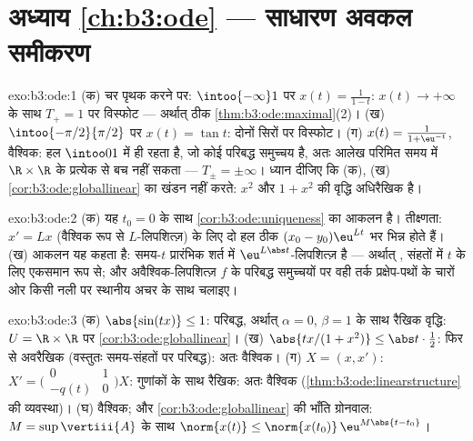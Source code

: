 \section*{अध्याय \ref{ch:b3:ode} --- साधारण अवकल
समीकरण}

\begin{solution}{exo:b3:ode:1}
(क) चर पृथक करने पर: $\intoo{-\infty}1$ पर $x(t) = \frac1{1 - t}$: $x(t) \to
+\infty$ के साथ $T_+ = 1$ पर विस्फोट ---
अर्थात् ठीक \cref{thm:b3:ode:maximal}(2)।
(ख) $\intoo{-\pi/2}{\pi/2}$ पर $x(t) = \tan t$: दोनों सिरों पर विस्फोट।
(ग) $x(t) = \frac{1}{1 + \eu^{-t}}$, वैश्विक: हल $\intoo01$ में ही रहता है, जो कोई परिबद्ध समुच्चय
है, अतः आलेख परिमित समय में $\R\times\R$ के प्रत्येक  से बच नहीं सकता
--- $T_\pm
= \pm\infty$। ध्यान दीजिए कि (क), (ख) \cref{cor:b3:ode:globallinear} का खंडन नहीं करते: $x^2$ और
$1 + x^2$ की वृद्धि अधिरैखिक है।
\end{solution}

\begin{solution}{exo:b3:ode:2}
(क) यह $t_0
= 0$ के साथ \cref{cor:b3:ode:uniqueness} का आकलन है। तीक्ष्णता: $x' = Lx$ (वैश्विक रूप से
$L$-लिपशित्ज़) के लिए दो हल ठीक $(x_0 - y_0)\eu^{Lt}$ भर भिन्न होते हैं।
(ख) आकलन यह कहता है: समय-$t$  प्रारंभिक शर्त में
$\eu^{L\abs t}$-लिपशित्ज़ है --- अर्थात् , संहतों में $t$ के लिए एकसमान
रूप से; और अवैश्विक-लिपशित्ज़ $f$ के परिबद्ध समुच्चयों पर वही तर्क
प्रक्षेप-पथों के चारों ओर किसी  नली पर स्थानीय अचर के साथ चलाइए।
\end{solution}

\begin{solution}{exo:b3:ode:3}
(क) $\abs{\sin(tx)} \leq 1$: परिबद्ध, अर्थात् $\alpha = 0$, $\beta = 1$ के साथ रैखिक वृद्धि: $U = \R\times\R$ पर
\cref{cor:b3:ode:globallinear}।
(ख) $\abs{tx/(1 + x^2)} \leq \abs t\cdot\frac12$: फिर से अवरैखिक (वस्तुतः समय-संहतों पर परिबद्ध): अतः
वैश्विक।
(ग) $X = (x, x')$: $X' = \bigl(\begin{smallmatrix}0 & 1\\ -q(t)
& 0\end{smallmatrix}\bigr)X$:  गुणांकों के साथ रैखिक: अतः वैश्विक (\cref{thm:b3:ode:linearstructure} की
व्यवस्था)।
(घ) वैश्विक; और \cref{cor:b3:ode:globallinear} की भाँति ग्रोनवाल: $M = \sup\vertiii{A}$ के साथ $\norm{x(t)} \leq \norm{x(t_0)}\,\eu^{M\abs{t - t_0}}$।
\end{solution}

